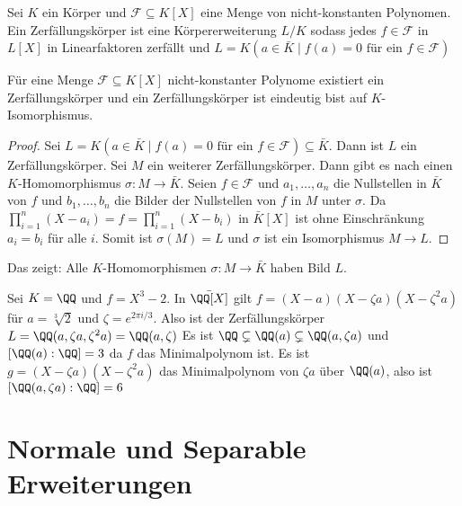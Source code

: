 \begin{Def}
    Sei \(K\) ein Körper und \(\mathcal F\subseteq K[X]\) eine Menge von nicht-konstanten Polynomen. Ein Zerfällungskörper ist eine Körpererweiterung \(L/K\) sodass jedes \(f\in\mathcal F\) in \(L[X]\) in Linearfaktoren zerfällt und \(L=K(a\in\bar K\mid f(a)=0 \text{ für ein } f\in\mathcal F)\)
\end{Def}
\begin{Lemma}
    Für eine Menge \(\mathcal F\subseteq K[X]\) nicht-konstanter Polynome existiert ein Zer\-fäl\-lungs\-kör\-per und ein Zer\-fäl\-lungs\-kör\-per ist eindeutig bist auf \(K\)-Isomorphismus.
\end{Lemma}
\begin{proof}
    Sei \(L=K(a\in\bar K\mid f(a)=0 \text{ für ein } f\in\mathcal F)\subseteq \bar K\). Dann ist \(L\) ein Zerfällungskörper.
    Sei \(M\) ein weiterer Zerfällungskörper. Dann gibt es nach  einen \(K\)-Homomorphismus \(\sigma\colon M\to\bar K\). Seien \(f\in\mathcal F\) und \(a_1,\dots, a_n\) die Nullstellen in \(\bar K\) von \(f\) und \(b_1,\dots,b_n\) die Bilder der Nullstellen von \(f\) in \(M\) unter \(\sigma\).
    Da \(\prod_{i=1}^n(X-a_i)=f=\prod_{i=1}^n(X-b_i)\) in \(\bar K[X]\) ist ohne Einschränkung \(a_i=b_i\) für alle \(i\). Somit ist \(\sigma(M)=L\) und \(\sigma\) ist ein Isomorphismus \(M\to L\).
\end{proof}
\begin{Bem}
    Das zeigt: Alle \(K\)-Homomorphismen \(\sigma\colon M\to \bar K\) haben Bild \(L\).
\end{Bem}
\begin{Bsp}
    Sei \(K=\QQ\) und \(f=X^3-2\). In \(\bar\QQ[X]\) gilt \(f=(X-a)(X-\zeta a)(X-\zeta^2a)\) für \(a=\sqrt[3]{2}\) und \(\zeta=e^{2\pi i/3}\).
    Also ist der Zerfällungskörper \(L=\QQ(a,\zeta a,\zeta^2 a)=\QQ(a,\zeta)\)
    Es ist \(\QQ\subsetneq \QQ(a)\subsetneq \QQ(a,\zeta a)\) und \([\QQ(a):\QQ]=3\) da \(f\) das Minimalpolynom ist. Es ist \(g=(X-\zeta a)(X-\zeta^2 a)\) das Minimalpolynom von \(\zeta a\) über \(\QQ(a)\), also ist \([\QQ(a,\zeta a):\QQ]=6\)
\end{Bsp}
\section{Normale und Separable Erweiterungen}
